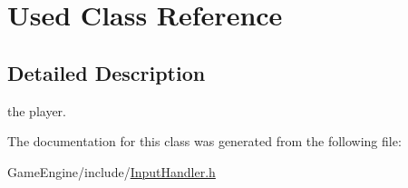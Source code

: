 \hypertarget{class_used}{}\section{Used Class Reference}
\label{class_used}


\subsection{Detailed Description}
the player. 

The documentation for this class was generated from the following file\+:\begin{DoxyCompactItemize}
\item 
Game\+Engine/include/\mbox{\hyperlink{_input_handler_8h}{Input\+Handler.\+h}}\end{DoxyCompactItemize}
